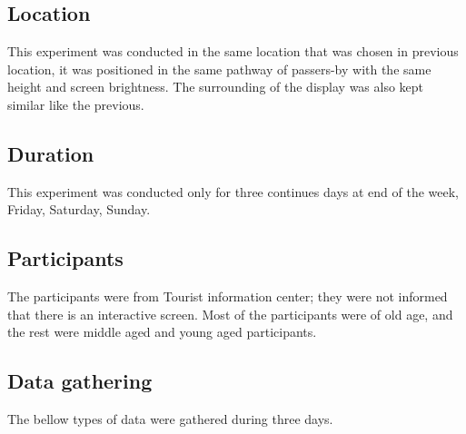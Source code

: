 \subsection{Location}
This experiment was conducted in the same location that was chosen in previous location, it was positioned in the same pathway of passers-by with the same height and screen brightness.  The surrounding of the display was also kept similar like the previous. 

\subsection{Duration}
This experiment was conducted only for three continues days at end of the week, Friday, Saturday, Sunday.

\subsection{Participants}
The participants were from Tourist information center; they were not informed that there is an interactive screen. Most of the participants were of old age, and the rest were middle aged and young aged participants. 

\subsection{Data gathering}
The bellow types of data were gathered during three days.


